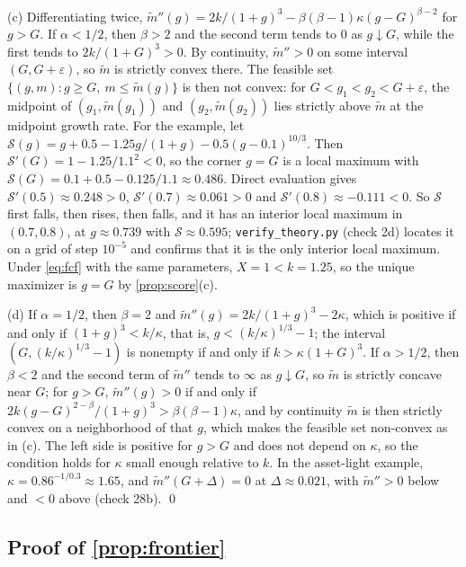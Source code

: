 (c) Differentiating twice, $\tilde m''(g)=2k/(1+g)^3-\beta(\beta-1)\kappa(g-G)^{\beta-2}$ for $g>G$. If $\alpha<1/2$, then $\beta>2$ and the second term tends to $0$ as $g\downarrow G$, while the first tends to $2k/(1+G)^3>0$. By continuity, $\tilde m''>0$ on some interval $(G,G+\varepsilon)$, so $\tilde m$ is strictly convex there. The feasible set $\{(g,m):g\ge G,\ m\le\tilde m(g)\}$ is then not convex: for $G<g_1<g_2<G+\varepsilon$, the midpoint of $(g_1,\tilde m(g_1))$ and $(g_2,\tilde m(g_2))$ lies strictly above $\tilde m$ at the midpoint growth rate. For the example, let $\mathcal S(g)=g+0.5-1.25g/(1+g)-0.5(g-0.1)^{10/3}$. Then $\mathcal S'(G)=1-1.25/1.1^2<0$, so the corner $g=G$ is a local maximum with $\mathcal S(G)=0.1+0.5-0.125/1.1\approx 0.486$. Direct evaluation gives $\mathcal S'(0.5)\approx 0.248>0$, $\mathcal S'(0.7)\approx 0.061>0$ and $\mathcal S'(0.8)\approx -0.111<0$. So $\mathcal S$ first falls, then rises, then falls, and it has an interior local maximum in $(0.7,0.8)$, at $g\approx 0.739$ with $\mathcal S\approx 0.595$; \texttt{verify\_theory.py} (check 2d) locates it on a grid of step $10^{-5}$ and confirms that it is the only interior local maximum. Under \eqref{eq:fcf} with the same parameters, $X=1<k=1.25$, so the unique maximizer is $g=G$ by \autoref{prop:score}(c).

(d) If $\alpha=1/2$, then $\beta=2$ and $\tilde m''(g)=2k/(1+g)^3-2\kappa$, which is positive if and only if $(1+g)^3<k/\kappa$, that is, $g<(k/\kappa)^{1/3}-1$; the interval $(G,(k/\kappa)^{1/3}-1)$ is nonempty if and only if $k>\kappa(1+G)^3$. If $\alpha>1/2$, then $\beta<2$ and the second term of $\tilde m''$ tends to $\infty$ as $g\downarrow G$, so $\tilde m$ is strictly concave near $G$; for $g>G$, $\tilde m''(g)>0$ if and only if $2k(g-G)^{2-\beta}/(1+g)^3>\beta(\beta-1)\kappa$, and by continuity $\tilde m$ is then strictly convex on a neighborhood of that $g$, which makes the feasible set non-convex as in (c). The left side is positive for $g>G$ and does not depend on $\kappa$, so the condition holds for $\kappa$ small enough relative to $k$. In the asset-light example, $\kappa=0.86^{-1/0.3}\approx1.65$, and $\tilde m''(G+\Delta)=0$ at $\Delta\approx0.021$, with $\tilde m''>0$ below and $<0$ above (check 28b). \qed

\subsection*{Proof of \autoref{prop:frontier}}

